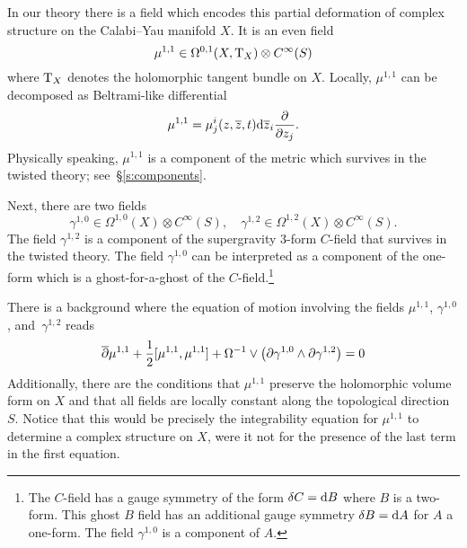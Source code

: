 In our theory there is a field which encodes this partial deformation of complex structure on the Calabi--Yau manifold $X$.
It is an even field 
\[
\mu^{1,1} \in \Omega^{0,1} (X , {\rm T}_X) \otimes C^\infty(S) 
\]
where ${\rm T}_X$ denotes the holomorphic tangent bundle on $X$.
Locally, $\mu^{1,1}$ can be decomposed as Beltrami-like differential
\[
\mu^{1,1} = \mu^i_j (z,\overline{z}, t) {\rm d} \overline{z}_i \frac{\partial}{\partial z_j} .
\]
Physically speaking, $\mu^{1,1}$ is a component of the metric which survives in the twisted theory; see~\S\ref{s:components}. 

Next, there are two fields 
\[
\gamma^{1,0} \in \Omega^{1,0} (X) \otimes C^\infty(S), \quad \gamma^{1,2} \in \Omega^{1,2}(X) \otimes C^\infty(S) .
\]
The field $\gamma^{1,2}$ is a component of the supergravity $3$-form $C$-field that survives in the twisted theory. 
The field $\gamma^{1,0}$ can be interpreted as a component of the one-form which is a ghost-for-a-ghost of the $C$-field.\footnote{The $C$-field has a gauge symmetry of the form $\delta C = {\rm d} B$ where $B$ is a two-form.
This ghost $B$ field has an additional gauge symmetry $\delta B = {\rm d} A$ for $A$ a one-form.
The field $\gamma^{1,0}$ is a component of $A$.}

There is a background where the equation of motion involving the fields $\mu^{1,1}$, $\gamma^{1,0}$,  and~$\gamma^{1,2}$ reads
\begin{align*}
\overline{\partial} \mu^{1,1} + \frac12 [\mu^{1,1}, \mu^{1,1}] + \Omega^{-1} \vee \left(\partial \gamma^{1,0} \wedge \partial \gamma^{1,2} \right) & = 0 \\
\end{align*}
Additionally, there are the conditions that $\mu^{1,1}$ preserve the holomorphic volume form on $X$ and that all fields are locally constant along the topological direction $S$.  
Notice that this would be precisely the integrability equation for $\mu^{1,1}$ to determine a complex structure on $X$, were it not for the presence of the last term in the first equation.

